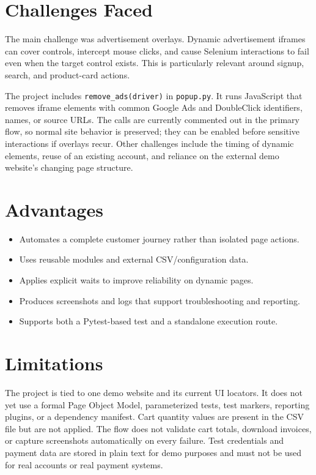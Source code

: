 \documentclass[12pt,a4paper]{article}
\begin{document}
\section{Challenges Faced}
The main challenge was advertisement overlays. Dynamic advertisement iframes can cover controls, intercept mouse clicks, and cause Selenium interactions to fail even when the target control exists. This is particularly relevant around signup, search, and product-card actions.

The project includes \texttt{remove\_ads(driver)} in \texttt{popup.py}. It runs JavaScript that removes iframe elements with common Google Ads and DoubleClick identifiers, names, or source URLs. The calls are currently commented out in the primary flow, so normal site behavior is preserved; they can be enabled before sensitive interactions if overlays recur. Other challenges include the timing of dynamic elements, reuse of an existing account, and reliance on the external demo website's changing page structure.

\section{Advantages}
\begin{itemize}[leftmargin=1.6em]
  \item Automates a complete customer journey rather than isolated page actions.
  \item Uses reusable modules and external CSV/configuration data.
  \item Applies explicit waits to improve reliability on dynamic pages.
  \item Produces screenshots and logs that support troubleshooting and reporting.
  \item Supports both a Pytest-based test and a standalone execution route.
\end{itemize}

\section{Limitations}
The project is tied to one demo website and its current UI locators. It does not yet use a formal Page Object Model, parameterized tests, test markers, reporting plugins, or a dependency manifest. Cart quantity values are present in the CSV file but are not applied. The flow does not validate cart totals, download invoices, or capture screenshots automatically on every failure. Test credentials and payment data are stored in plain text for demo purposes and must not be used for real accounts or real payment systems.
\end{document}
